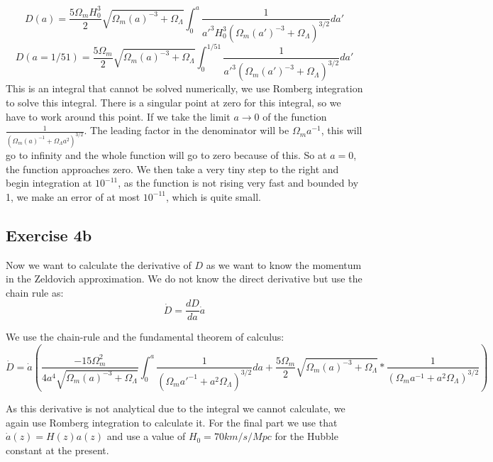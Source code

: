\begin{equation}
    D(a)=\frac{5\Omega_m H_0^3}{2}\sqrt{\Omega_m(a)^{-3}+\Omega_{\Lambda}}\displaystyle\int_{0}^{a}{\frac{1}{a'^3H_0^3\left(\Omega_m(a')^{-3}+\Omega_{\Lambda}\right)^{3/2}}da'}
\end{equation}
\begin{equation}
    D(a=1/51)=\frac{5\Omega_m}{2}\sqrt{\Omega_m(a)^{-3}+\Omega_{\Lambda}}\displaystyle\int_{0}^{1/51}{\frac{1}{a'^3\left(\Omega_m(a')^{-3}+\Omega_{\Lambda}\right)^{3/2}}da'}
\end{equation}
This is an integral that cannot be solved numerically, we use Romberg integration to solve this integral. There is a singular point at zero for this integral, so we have to work around this point. If we take the limit $a\rightarrow 0$ of the function $\frac{1}{\left(\Omega_m(a)^{-1}+\Omega_{\Lambda}a^2\right)^{3/2}}$. The leading factor in the denominator will be $\Omega_m a^{-1}$, this will go to infinity and the whole function will go to zero because of this. So at $a=0$, the function approaches zero. We then take a very tiny step to the right and begin integration at $10^{-11}$, as the function is not rising very fast and bounded by 1, we make an error of at most $10^{-11}$, which is quite small.




\subsection{Exercise 4b}
Now we want to calculate the derivative of $D$ as we want to know the momentum in the Zeldovich approximation. We do not know the direct derivative but use the chain rule as:
\begin{equation}
    \dot{D}=\frac{dD}{da}\dot{a}
\end{equation}

We use the chain-rule and the fundamental theorem of calculus:
\begin{equation}
    \dot{D}=\dot{a}\left(\frac{-15\Omega_m^2}{4a^4\sqrt{\Omega_m(a)^{-3}+\Omega_{\Lambda}}}\displaystyle\int_{0}^{a}{\frac{1}{\left(\Omega_ma'^{-1}+a^2\Omega_{\Lambda}\right)^{3/2}}da}+\frac{5\Omega_m}{2}\sqrt{\Omega_m(a)^{-3}+\Omega_{\Lambda}}*\frac{1}{\left(\Omega_ma^{-1}+a^2\Omega_{\Lambda}\right)^{3/2}}   \right)
\end{equation}

As this derivative is not analytical due to the integral we cannot calculate, we again use Romberg integration to calculate it. For the final part we use that $\dot{a}(z)=H(z)a(z)$ and use a value of $H_0=70km/s/Mpc$ for the Hubble constant at the present.



